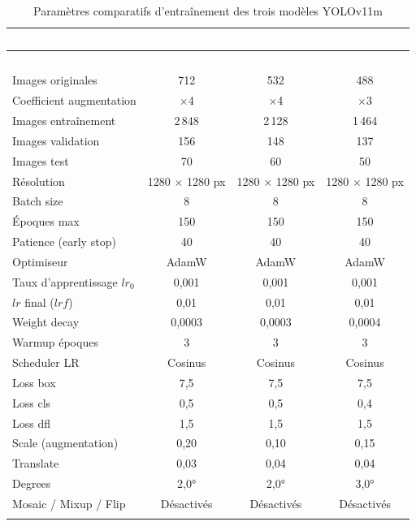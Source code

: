 \small
\begin{longtable}{|l|c|c|c|}
  \rowcolor{bleu_principal}
  \textcolor{white}{\textbf{Paramètre}} & \textcolor{white}{\textbf{CIN Recto}} & \textcolor{white}{\textbf{CIN Verso}} & \textcolor{white}{\textbf{Passeport}} \\
  \endfirsthead
  \rowcolor{bleu_principal}
  \textcolor{white}{\textbf{Paramètre}} & \textcolor{white}{\textbf{CIN Recto}} & \textcolor{white}{\textbf{CIN Verso}} & \textcolor{white}{\textbf{Passeport}} \\
  \endhead
  \midrule
  Images originales & 712 & 532 & 488 \\
  \midrule
  \rowcolor{gris_leger}
  Coefficient augmentation & $\times$4 & $\times$4 & $\times$3 \\
  \midrule
  Images entraînement & 2\,848 & 2\,128 & 1\,464 \\
  \midrule
  \rowcolor{gris_leger}
  Images validation & 156 & 148 & 137 \\
  \midrule
  Images test & 70 & 60 & 50 \\
  \midrule
  \rowcolor{gris_leger}
  Résolution & 1280 $\times$ 1280 px & 1280 $\times$ 1280 px & 1280 $\times$ 1280 px \\
  \midrule
  Batch size & 8 & 8 & 8 \\
  \midrule
  \rowcolor{gris_leger}
  Époques max & 150 & 150 & 150 \\
  \midrule
  Patience (early stop) & 40 & 40 & 40 \\
  \midrule
  \rowcolor{gris_leger}
  Optimiseur & AdamW & AdamW & AdamW \\
  \midrule
  Taux d'apprentissage $lr_0$ & 0,001 & 0,001 & 0,001 \\
  \midrule
  \rowcolor{gris_leger}
  $lr$ final ($lrf$) & 0,01 & 0,01 & 0,01 \\
  \midrule
  Weight decay & 0,0003 & 0,0003 & 0,0004 \\
  \midrule
  \rowcolor{gris_leger}
  Warmup époques & 3 & 3 & 3 \\
  \midrule
  Scheduler LR & Cosinus & Cosinus & Cosinus \\
  \midrule
  \rowcolor{gris_leger}
  Loss box & 7,5 & 7,5 & 7,5 \\
  \midrule
  Loss cls & 0,5 & 0,5 & 0,4 \\
  \midrule
  \rowcolor{gris_leger}
  Loss dfl & 1,5 & 1,5 & 1,5 \\
  \midrule
  Scale (augmentation) & 0,20 & 0,10 & 0,15 \\
  \midrule
  \rowcolor{gris_leger}
  Translate & 0,03 & 0,04 & 0,04 \\
  \midrule
  Degrees & 2,0° & 2,0° & 3,0° \\
  \midrule
  \rowcolor{gris_leger}
  Mosaic / Mixup / Flip & Désactivés & Désactivés & Désactivés \\
  \bottomrule
  \caption{Paramètres comparatifs d'entraînement des trois modèles YOLOv11m}
  \label{tab:ch3-params-yolo}
\end{longtable}
\normalsize


